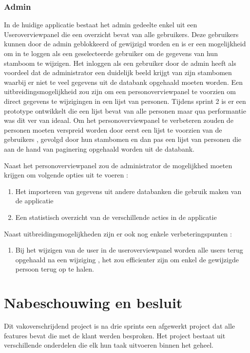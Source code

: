 \documentclass[pdftex,a4paper,12pt,twoside]{report}
\begin{document}
\subsection{Admin}

In de huidige applicatie bestaat het admin gedeelte enkel uit een Useroverviewpanel die een overzicht bevat van alle gebruikers.
Deze gebruikers kunnen door de admin geblokkeerd of gewijzigd worden en is er een mogelijkheid om in te loggen als een geselecteerde gebruiker om de gegevens van hun stamboom te wijzigen.
Het inloggen als een gebruiker door de admin heeft als voordeel dat de administrator een duidelijk beeld krijgt van zijn stambomen waarbij er niet te veel gegevens uit de databank opgehaald moeten worden.
Een uitbreidingsmogelijkheid zou zijn om een personoverviewpanel te voorzien om direct gegevens te wijzigingen in een lijst van personen.
Tijdens sprint 2 is er een prototype ontwikkelt die een lijst bevat van alle personen maar qua performantie was dit ver van ideaal.
Om het personoverviewpanel te verbeteren zouden de personen moeten verspreid worden door eerst een lijst te voorzien van de gebruikers , gevolgd door hun stambomen en dan pas een lijst van personen die aan de hand van paginering opgehaald worden uit de databank. 

Naast het personoverviewpanel zou de administrator de mogelijkhed moeten krijgen om volgende opties uit te voeren :
\begin{enumerate}
\item \label{it:first} Het importeren van gegevens uit andere databanken die gebruik maken van de applicatie
\item \label{it:first} Een statistisch overzicht van de verschillende acties in de applicatie
\end{enumerate}









Naast uitbreidingsmogelijkheden zijn er ook nog enkele verbeteringspunten :

\begin{enumerate}
\item \label{it:first} Bij het wijzigen van de user in de useroverviewpanel worden alle users terug opgehaald na een wijziging , het zou efficienter zijn om enkel de gewijzigde persoon terug op te halen.
\end{enumerate}



\chapter{Nabeschouwing en besluit}
Dit vakoverschrijdend project is na drie sprints een afgewerkt project dat alle features bevat die met de klant werden besproken. Het project bestaat uit verschillende onderdelen die elk hun taak uitvoeren binnen het geheel.
\end{document}
